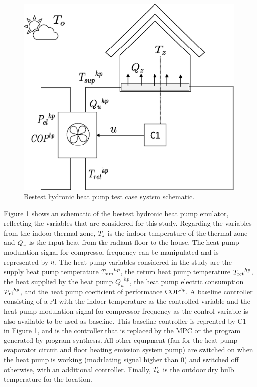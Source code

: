 \begin{figure}[H]
  \centering
  \includegraphics[scale=.4]{images/boptest/Fig1.eps}
\caption{Bestest hydronic heat pump test case system schematic.}
\label{fig:bestest-heatpump}       %
\end{figure}
%
Figure \ref{fig:bestest-heatpump} shows an schematic of the bestest hydronic heat pump emulator, reflecting the variables that are considered for this study. Regarding the variables from the indoor thermal zone, $T_z$ is the indoor temperature of the thermal zone and $Q_z$ is the input heat from the radiant floor to the house. The heat pump modulation signal for compressor frequency can be manipulated and is represented by $u$. The heat pump variables considered in the study are the supply heat pump temperature ${T_\text{sup}}^{hp}$, the return heat pump temperature ${T_\text{ret}}^{hp}$, the heat supplied by the heat pump ${Q_{u}}^{hp}$, the heat pump electric consumption ${\mathcal{P}_\text{el}}^{hp}$, and the heat pump coefficient of performance $\text{COP}^{hp}$. A baseline controller consisting of a PI with the indoor temperature as the controlled variable and the heat pump modulation signal for compressor frequency as the control variable is also available to be used as baseline. This baseline controller is reprented by C1 in Figure \ref{fig:bestest-heatpump}, and is the controller that is replaced by the MPC or the program generated by program synthesis. All other equipment (fan for the heat pump evaporator circuit and floor heating emission system pump) are switched on when the heat pump is working (modulating signal higher than 0) and switched off otherwise, with an additional controller. Finally, $T_o$ is the outdoor dry bulb temperature for the location.

